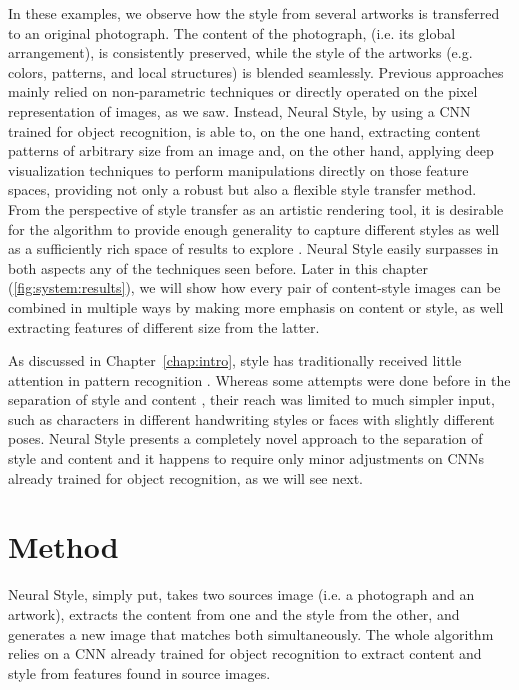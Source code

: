 In these examples, we observe how the style from several artworks is transferred to an original photograph.
The content of the photograph, (i.e. its global arrangement), is consistently preserved, while the style of the artworks (e.g. colors, patterns, and local structures) is blended seamlessly.
Previous approaches mainly relied on non-parametric techniques or directly operated on the pixel representation of images, as we saw.
Instead, Neural Style, by using a CNN trained for object recognition, is able to, on the one hand, extracting content patterns of arbitrary size from an image and, on the other hand, applying deep visualization techniques to perform manipulations directly on those feature spaces, providing not only a robust but also a flexible style transfer method.
From the perspective of style transfer as an artistic rendering tool, it is desirable for the algorithm to provide enough generality to capture different styles as well as a sufficiently rich space of results to explore \cite{Ashikhmin2003}.
Neural Style easily surpasses in both aspects any of the techniques seen before.
Later in this chapter (\autoref{fig:system:results}), we will show how every pair of content-style images can be combined in multiple ways by making more emphasis on content or style, as well extracting features of different size from the latter.

As discussed in Chapter~\ref{chap:intro}, style has traditionally received little attention in pattern recognition \cite{Karayev2014}.
Whereas some attempts were done before in the separation of style and content \cite{Tenenbaum2000,Elgammal2004}, their reach was limited to much simpler input, such as characters in different handwriting styles or faces with slightly different poses.
Neural Style presents a completely novel approach to the separation of style and content and it happens to require only minor adjustments on CNNs already trained for object recognition, as we will see next.



\section{Method}
\label{sec:system:method}

Neural Style, simply put, takes two sources image (i.e. a photograph and an artwork), extracts the content from one and the style from the other, and generates a new image that matches both simultaneously.
The whole algorithm relies on a CNN already trained for object recognition to extract content and style from features found in source images.

